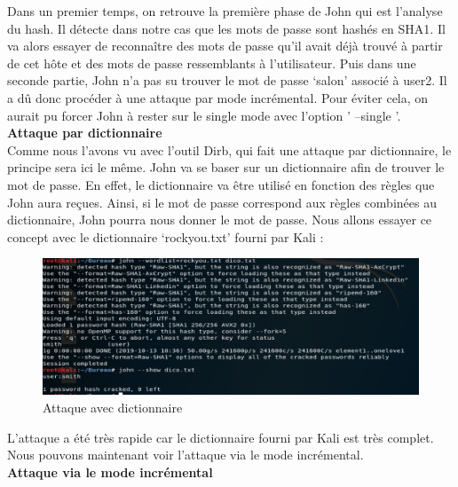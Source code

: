 Dans un premier temps, on retrouve la première phase de John qui est l’analyse du hash. Il détecte dans notre cas que les mots de passe sont hashés en SHA1.
Il va alors essayer de reconnaître des mots de passe qu’il avait déjà trouvé à partir de cet hôte et des mots de passe ressemblants à l’utilisateur.
Puis dans une seconde partie, John n’a pas su trouver le mot de passe ‘salon’ associé à user2. Il a dû donc procéder à une attaque par mode incrémental. Pour éviter cela, on aurait pu forcer John à rester sur le single mode avec l'option ' --single '.\\


 \textbf{Attaque par dictionnaire}\\

Comme nous l’avons vu avec l’outil Dirb, qui fait une attaque par dictionnaire, le principe sera ici le même. John va se baser sur un dictionnaire afin de trouver le mot de passe. En effet, le dictionnaire va être utilisé en fonction des règles que John aura reçues. Ainsi, si le mot de passe correspond aux règles combinées au dictionnaire, John pourra nous donner le mot de passe.
Nous allons essayer ce concept avec le dictionnaire ‘rockyou.txt’ fourni par Kali :

\begin{figure}[htp!]
  \centering
  \setlength\figureheight{7cm}
  \setlength\figurewidth{9cm}
  \includegraphics[width=1\textwidth]{oui/Ancien/imangeancien/john/Dico.PNG}
  \caption{Attaque avec dictionnaire}
  \label{fig:courbe-tikz}
\end{figure}

\vspace{0,8cm}

L’attaque a été très rapide car le dictionnaire fourni par Kali est très complet.
Nous pouvons maintenant voir l’attaque via le mode incrémental.\\

 \textbf{Attaque via le mode incrémental}\\

